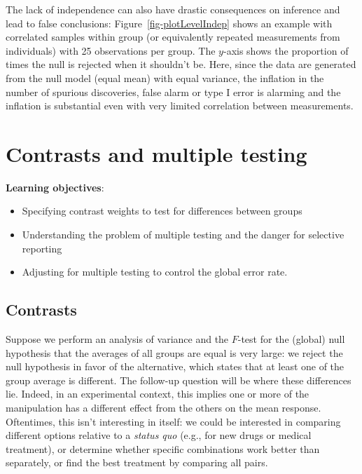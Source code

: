 \documentclass[
  11pt,
  letterpaper,
]{scrbook}
\providecommand{\tightlist}{%
  \setlength{\itemsep}{0pt}\setlength{\parskip}{0pt}}\usepackage{longtable,booktabs,array}
\theoremstyle{definition}
\theoremstyle{definition}
\theoremstyle{remark}
\begin{document}
The lack of independence can also have drastic consequences on inference
and lead to false conclusions: Figure~\ref{fig-plotLevelIndep} shows an
example with correlated samples within group (or equivalently repeated
measurements from individuals) with 25 observations per group. The
\(y\)-axis shows the proportion of times the null is rejected when it
shouldn't be. Here, since the data are generated from the null model
(equal mean) with equal variance, the inflation in the number of
spurious discoveries, false alarm or type I error is alarming and the
inflation is substantial even with very limited correlation between
measurements.


\chapter{Contrasts and multiple
testing}\label{contrasts-multiple-testing}

\begin{tcolorbox}[enhanced jigsaw, opacityback=0, opacitybacktitle=0.6, leftrule=.75mm, colbacktitle=quarto-callout-important-color!10!white, breakable, toptitle=1mm, bottomrule=.15mm, title=\textcolor{quarto-callout-important-color}{\faExclamation}\hspace{0.5em}{Key concept}, coltitle=black, colframe=quarto-callout-important-color-frame, colback=white, left=2mm, toprule=.15mm, arc=.35mm, bottomtitle=1mm, titlerule=0mm, rightrule=.15mm]

\textbf{Learning objectives}:

\begin{itemize}
\tightlist
\item
  Specifying contrast weights to test for differences between groups
\item
  Understanding the problem of multiple testing and the danger for
  selective reporting
\item
  Adjusting for multiple testing to control the global error rate.
\end{itemize}

\end{tcolorbox}

\section{Contrasts}\label{contrasts}

Suppose we perform an analysis of variance and the \(F\)-test for the
(global) null hypothesis that the averages of all groups are equal is
very large: we reject the null hypothesis in favor of the alternative,
which states that at least one of the group average is different. The
follow-up question will be where these differences lie. Indeed, in an
experimental context, this implies one or more of the manipulation has a
different effect from the others on the mean response. Oftentimes, this
isn't interesting in itself: we could be interested in comparing
different options relative to a \emph{status quo} (e.g., for new drugs
or medical treatment), or determine whether specific combinations work
better than separately, or find the best treatment by comparing all
pairs.
\end{document}
